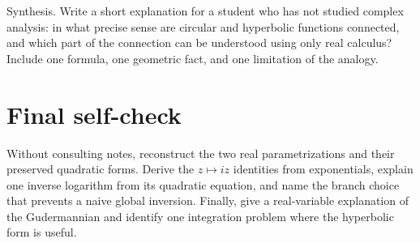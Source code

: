 \documentclass{workbook}
\begin{document}
\begin{problem}{Synthesis.}
Write a short explanation for a student who has not studied
complex analysis: in what precise sense are circular and
hyperbolic functions connected, and which part of the connection
can be understood using only real calculus? Include one formula,
one geometric fact, and one limitation of the analogy.
\end{problem}

\section*{Final self-check}

Without consulting notes, reconstruct the two real parametrizations and
their preserved quadratic forms. Derive the $z\mapsto iz$ identities from
exponentials, explain one inverse logarithm from its quadratic equation,
and name the branch choice that prevents a naive global inversion.
Finally, give a real-variable explanation of the Gudermannian and identify
one integration problem where the hyperbolic form is useful.
\end{document}
